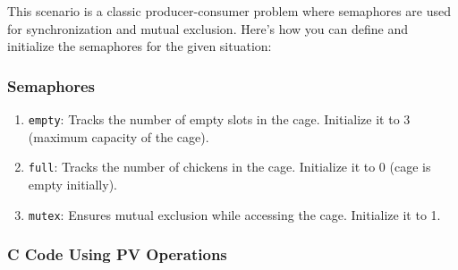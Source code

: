 \documentclass[a4paper]{book}
\begin{document}
This scenario is a classic producer-consumer problem where semaphores are used for synchronization and mutual exclusion. Here's how you can define and initialize the semaphores for the given situation:

\subsubsection{Semaphores}
\begin{enumerate}
\item 
\verb|empty|: Tracks the number of empty slots in the cage. Initialize it to 3 (maximum capacity of the cage).

\item 
\verb|full|: Tracks the number of chickens in the cage. Initialize it to 0 (cage is empty initially).

\item 
\verb|mutex|: Ensures mutual exclusion while accessing the cage. Initialize it to 1.

\end{enumerate}

\subsubsection{C Code Using PV Operations}
\end{document}
